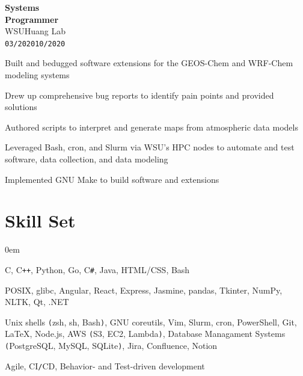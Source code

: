 \documentclass[15pt]{article}
\newenvironment{itemize*}%
  {\begin{itemize}[leftmargin=*,label=\faChevronRight]%
    \setlength{\itemsep}{0pt}%
    \setlength{\parskip}{0pt}%
    \setlength{\parsep}{0pt}}%
  {\end{itemize}}
\newcommand\workexp[5]{
    \begin{minipage}[t]{0.165\textwidth}
            \raggedleft
                \textbf{\fontsize{14}{12}\selectfont #1}\\ 
                #2\\
                \small\texttt{#3}\textendash \texttt{#4}
    \end{minipage}\hspace*{5pt}%
    \begin{minipage}[t]{0.8\textwidth}
        \raggedright
        \fontsize{13}{13}\selectfont#5
    \end{minipage}
}
\begin{document}
\workexp{Systems\\ Programmer}{WSU\textendash Huang Lab}{03/2020}{10/2020}{%
    \begin{itemize*}
        \item Built and bedugged software extensions for the GEOS-Chem and WRF-Chem modeling systems
        \item Drew up comprehensive bug reports to identify pain points and provided solutions
        \item Authored scripts to interpret and generate maps from atmospheric data models
        \item Leveraged Bash, cron, and Slurm via WSU's HPC nodes to automate and test software, data collection, and data modeling
        \item Implemented GNU Make to build software and extensions
    \end{itemize*}%
}

\vspace*{-10pt}
\section*{Skill Set}
\vspace*{-5pt}\hspace*{10pt}\begin{minipage}{0.935\textwidth}
    \begin{description}
        \itemsep0em
        \raggedright
        \item[Languages] C, C\texttt{++}, Python, Go, C\texttt{\#}, Java, HTML/CSS, Bash
        \item[Frameworks\texttt{/}Libraries] POSIX, glibc, Angular, React, Express, Jasmine, pandas, Tkinter, NumPy, NLTK,
            Qt, .NET
        \item[Tools] Unix shells \texttt{(}zsh, sh, Bash\texttt{)}, GNU coreutils, Vim, Slurm, cron, PowerShell, Git, \LaTeX, Node.js,
            AWS \texttt{(}S3, EC2, Lambda\texttt{)}, Database Managament Systems \texttt{(}PostgreSQL, MySQL, SQLite\texttt{)}, Jira, Confluence, Notion
        \item[Methodologies] Agile, CI\texttt{/}CD, Behavior- and Test-driven development
    \end{description}
\end{minipage}

\vspace*{-10pt}
\end{document}
